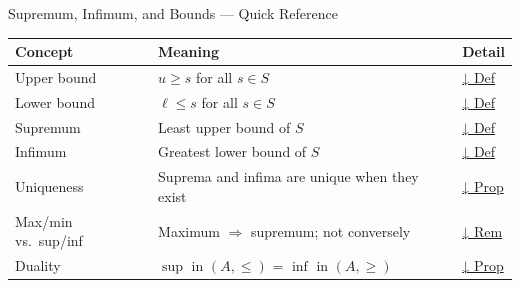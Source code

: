 

\begin{toolkitbox}{Supremum, Infimum, and Bounds — Quick Reference}
\small
\begin{tabular}{l l l}
\toprule
\textbf{Concept} & \textbf{Meaning} & \textbf{Detail} \\
\midrule
Upper bound       & $u \geq s$ for all $s \in S$                       & \hyperref[def:bounds]{↓ Def} \\
Lower bound       & $\ell \leq s$ for all $s \in S$                    & \hyperref[def:bounds]{↓ Def} \\
Supremum          & Least upper bound of $S$                           & \hyperref[def:sup-inf]{↓ Def} \\
Infimum           & Greatest lower bound of $S$                        & \hyperref[def:sup-inf]{↓ Def} \\
Uniqueness        & Suprema and infima are unique when they exist       & \hyperref[prop:sup-unique]{↓ Prop} \\
Max/min vs.\ sup/inf & Maximum $\Rightarrow$ supremum; not conversely & \hyperref[rem:max-vs-sup]{↓ Rem} \\
Duality           & $\sup$ in $(A,\leq)$ = $\inf$ in $(A,\geq)$        & \hyperref[prop:sup-inf-duality]{↓ Prop} \\
\bottomrule
\end{tabular}
\end{toolkitbox}



